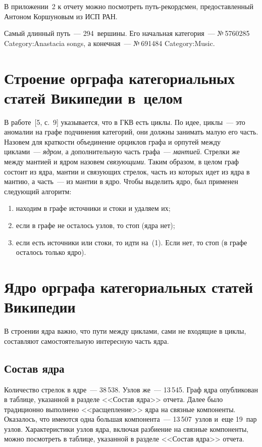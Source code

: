 \begin{multicols}{2}
   В приложении~2 к отчету можно посмотреть путь-рекордсмен, предоставленный Антоном 
Коршуновым из ИСП РАН.
   
   Самый длинный путь~--- 294~вершины. Его начальная категория~--- №\,5760285 
Category:Anastacia songs, а конечная~--- №\,691484 Category:Music. 

\section{Строение орграфа категориальных статей Википедии в~целом}

   В работе~[5, с.~9] указывается, что в ГКВ есть циклы. По идее, циклы~--- это аномалии на 
графе подчинения категорий, они долж\-ны занимать малую его часть. Назовем для краткости 
объединение орциклов графа и орпутей между циклами~--- \textit{ядром}, а дополнительную 
часть графа~--- \textit{мантией}. Стрелки же между мантией и ядром назовем 
\textit{связующими}. Таким образом, в целом граф состоит из ядра, мантии и связующих 
стрелок, часть из которых идет из ядра в мантию, а часть~--- из мантии в ядро. Чтобы 
выделить ядро, был применен следующий алгоритм: 
   \begin{enumerate}[(1)]
   \item находим в графе источники и стоки и удаляем их; 
   \item если в графе не осталось узлов, то стоп (ядра нет);
   \item если есть источники или стоки, то идти на~(1). Если нет, то
   стоп (в графе осталось только ядро).
   \end{enumerate}
   
\section{Ядро орграфа категориальных статей Википедии}
   
   В строении ядра важно, что пути между циклами, сами не входящие в циклы, составляют 
самостоятельную интересную часть ядра. 

\subsection{Состав ядра}

   Количество стрелок в ядре~--- 38\,538. Узлов же~--- 13\,545. Граф ядра опубликован в 
таблице, указанной в разделе <<Состав ядра>> отчета. Далее было традиционно выполнено 
<<расщепление>> ядра на связные компоненты. Оказалось, что имеются одна большая 
компонента~--- 13\,507~узлов и~еще 19~пар узлов. Характеристики узлов ядра, включая 
разбиение на связные компоненты, можно посмотреть в таблице, указанной в разделе 
<<Состав ядра>> отчета.
   

\end{multicols}
